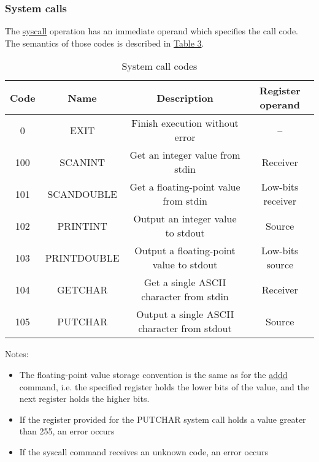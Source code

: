 \documentclass{article}
\newcommand{\St}[1]{{\fontfamily{qcr}\selectfont #1}}
\begin{document}
\hypertarget{syscall:details}{}
\subsubsection{System calls}

The \hyperlink{syscall}{\St{syscall}} operation has an immediate operand which specifies the call code. The semantics of those codes is described in \hyperlink{syscall:codes}{Table 3}.

\hypertarget{syscall:codes}{}
{
\renewcommand{\arraystretch}{1.4}
\begin{table}[h!]
\centering
\caption{System call codes}
\vspace{2mm}
\begin{tabular}{| c | c | c | c |}
 \hline
 Code & Name & Description & Register operand \\ 
 \hline
 0 & \St{EXIT} & Finish execution without error & -- \\
 100 & \St{SCANINT} & Get an integer value from \St{stdin} & Receiver \\
 101 & \St{SCANDOUBLE} & Get a floating-point value from \St{stdin} & Low-bits receiver \\
 102 & \St{PRINTINT} & Output an integer value to \St{stdout} & Source \\
 103 & \St{PRINTDOUBLE} & Output a floating-point value to \St{stdout} & Low-bits source \\
 104 & \St{GETCHAR} & Get a single \St{ASCII} character from \St{stdin} & Receiver \\
 105 & \St{PUTCHAR} & Output a single \St{ASCII} character from \St{stdout} & Source \\
 \hline
\end{tabular}
\end{table}
}

Notes:

\begin{itemize}
	\item The floating-point value storage convention is the same as for the \hyperlink{addd}{\St{addd}} command, i.e. the specified register holds the lower bits of the value, and the next register holds the higher bits.
	\item If the register provided for the \St{PUTCHAR} system call holds a value greater than 255, an error occurs
	\item If the \St{syscall} command receives an unknown code, an error occurs
\end{itemize}
\end{document}
